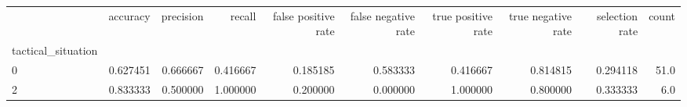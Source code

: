 \begin{tabular}{lrrrrrrrrr}
\toprule
{} &  accuracy &  precision &    recall &  false positive rate &  false negative rate &  true positive rate &  true negative rate &  selection rate &  count \\
tactical\_situation &           &            &           &                      &                      &                     &                     &                 &        \\
\midrule
0                  &  0.627451 &   0.666667 &  0.416667 &             0.185185 &             0.583333 &            0.416667 &            0.814815 &        0.294118 &   51.0 \\
2                  &  0.833333 &   0.500000 &  1.000000 &             0.200000 &             0.000000 &            1.000000 &            0.800000 &        0.333333 &    6.0 \\
\bottomrule
\end{tabular}
